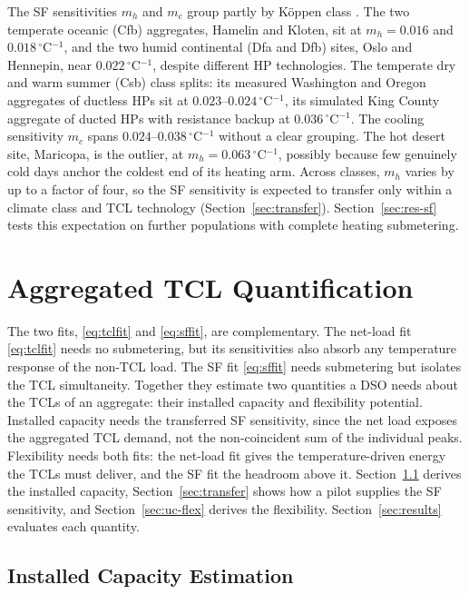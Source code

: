The SF sensitivities $m_h$ and $m_c$ group partly by K{\"o}ppen class \cite{beck2018koppen}. The two temperate oceanic (Cfb) aggregates, Hamelin and Kloten, sit at $m_h=0.016$ and $0.018\,^\circ$C$^{-1}$, and the two humid continental (Dfa and Dfb) sites, Oslo and Hennepin, near $0.022\,^\circ$C$^{-1}$, despite different HP technologies. The temperate dry and warm summer (Csb) class splits: its measured Washington and Oregon aggregates of ductless HPs sit at $0.023$--$0.024\,^\circ$C$^{-1}$, its simulated King County aggregate of ducted HPs with resistance backup at $0.036\,^\circ$C$^{-1}$. The cooling sensitivity $m_c$ spans $0.024$--$0.038\,^\circ$C$^{-1}$ without a clear grouping. The hot desert site, Maricopa, is the outlier, at $m_h=0.063\,^\circ$C$^{-1}$, possibly because few genuinely cold days anchor the coldest end of its heating arm. Across classes, $m_h$ varies by up to a factor of four, so the SF sensitivity is expected to transfer only within a climate class and TCL technology (Section~\ref{sec:transfer}). Section~\ref{sec:res-sf} tests this expectation on further populations with complete heating submetering.

\section{Aggregated TCL Quantification}
\label{sec:estimation}

The two fits, \eqref{eq:tclfit} and \eqref{eq:sffit}, are complementary. The net-load fit \eqref{eq:tclfit} needs no submetering, but its sensitivities also absorb any temperature response of the non-TCL load. The SF fit \eqref{eq:sffit} needs submetering but isolates the TCL simultaneity. Together they estimate two quantities a DSO needs about the TCLs of an aggregate: their installed capacity and flexibility potential. Installed capacity needs the transferred SF sensitivity, since the net load exposes the aggregated TCL demand, not the non-coincident sum of the individual peaks. Flexibility needs both fits: the net-load fit gives the temperature-driven energy the TCLs must deliver, and the SF fit the headroom above it. Section~\ref{sec:uc-capacity} derives the installed capacity, Section~\ref{sec:transfer} shows how a pilot supplies the SF sensitivity, and Section~\ref{sec:uc-flex} derives the flexibility. Section~\ref{sec:results} evaluates each quantity.

\subsection{Installed Capacity Estimation}
\label{sec:uc-capacity}

